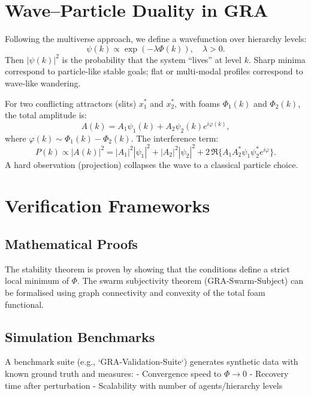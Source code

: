 \documentclass[12pt,a4paper]{article}
\begin{document}
\section{Wave--Particle Duality in GRA}

Following the multiverse approach, we define a wavefunction over hierarchy levels:
\begin{equation}
\psi(k) \propto \exp(-\lambda \Phi(k)),\quad \lambda > 0.
\end{equation}
Then $|\psi(k)|^2$ is the probability that the system ``lives'' at level $k$. Sharp minima correspond to particle‑like stable goals; flat or multi‑modal profiles correspond to wave‑like wandering.

For two conflicting attractors (slits) $x_1^*$ and $x_2^*$, with foams $\Phi_1(k)$ and $\Phi_2(k)$, the total amplitude is:
\begin{equation}
A(k) = A_1 \psi_1(k) + A_2 \psi_2(k) e^{i \varphi(k)},
\end{equation}
where $\varphi(k) \sim \Phi_1(k) - \Phi_2(k)$. The interference term:
\begin{equation}
P(k) \propto |A(k)|^2 = |A_1|^2|\psi_1|^2 + |A_2|^2|\psi_2|^2 + 2\,\Re\{ A_1 A_2^* \psi_1 \psi_2^* e^{i\varphi} \}.
\end{equation}
A hard observation (projection) collapses the wave to a classical particle choice.

\section{Verification Frameworks}

\subsection{Mathematical Proofs}
The stability theorem is proven by showing that the conditions define a strict local minimum of $\Phi$. The swarm subjectivity theorem (GRA-Swarm-Subject) can be formalised using graph connectivity and convexity of the total foam functional.

\subsection{Simulation Benchmarks}
A benchmark suite (e.g., `GRA-Validation-Suite`) generates synthetic data with known ground truth and measures:
- Convergence speed to $\Phi \to 0$
- Recovery time after perturbation
- Scalability with number of agents/hierarchy levels
\end{document}
